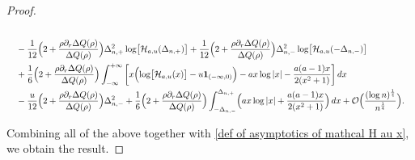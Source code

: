 \documentclass[reqno]{amsart}
\newcommand{\1}{\mathds{1}}
\numberwithin{equation}{section}
\theoremstyle{definition}
\begin{document}
\begin{proof}
\begin{align*}
\\
&\quad
-
\frac{1}{12}\Bigl(2+\frac{\rho\partial_r\Delta Q(\rho)}{\Delta Q(\rho)}\Bigr)
\Delta_{n,+}^2\log\bigl[\mathcal{H}_{a,u}(\Delta_{n,+})\bigr]
+
\frac{1}{12}\Bigl(2+\frac{\rho\partial_r\Delta Q(\rho)}{\Delta Q(\rho)}\Bigr)
\Delta_{n,-}^2\log\bigl[\mathcal{H}_{a,u}(-\Delta_{n,-})\bigr]
\\
&\quad 
+\frac{1}{6}\Bigl(2+\frac{\rho\partial_r\Delta Q(\rho)}{\Delta Q(\rho)}\Bigr)
\int_{-\infty}^{+\infty}
\bigg[
x\Bigl(\log\bigl[\mathcal{H}_{a,u}(x)\bigr] 
- u\mathbf{1}_{(-\infty,0)}
\Big)
-ax\log|x| 
-\frac{a(a-1)x}{2(x^2+1)}
\bigg]\,dx
\\
&\quad 
-\frac{u}{12}\Bigl(2+\frac{\rho\partial_r\Delta Q(\rho)}{\Delta Q(\rho)}\Bigr)
\Delta_{n,-}^2
+\frac{1}{6}\Bigl(2+\frac{\rho\partial_r\Delta Q(\rho)}{\Delta Q(\rho)}\Bigr)
\int_{-\Delta_{n,-}}^{\Delta_{n,+}}
\Bigl(ax\log|x| + \frac{a(a-1)x}{2(x^2+1)}\Bigr)\,dx
+\mathcal{O}\Bigl(\frac{(\log n)^{\frac{1}{4}}}{n^{\frac{1}{4}}}\Bigr).
\end{align*}

Combining all of the above together with \eqref{def of asymptotics of mathcal H au x}, we obtain the result. 
\end{proof}
\end{document}
